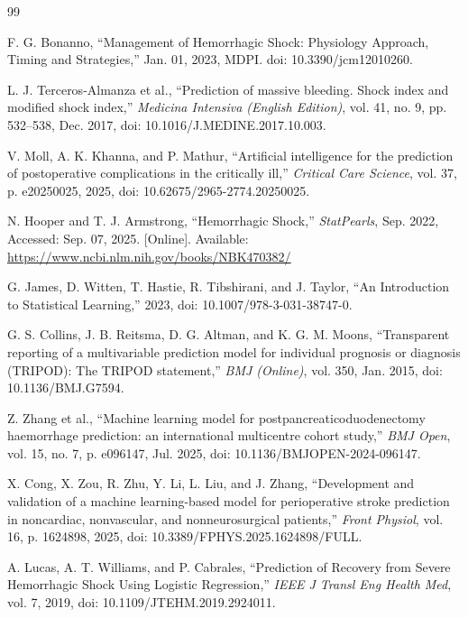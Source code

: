 \documentclass[12pt, letterpaper]{article}
\begin{document}
\begin{thebibliography}{99}

F. G. Bonanno, ``Management of Hemorrhagic Shock: Physiology Approach, Timing and Strategies,'' Jan. 01, 2023, MDPI. doi: 10.3390/jcm12010260.

L. J. Terceros-Almanza et al., ``Prediction of massive bleeding. Shock index and modified shock index,'' \textit{Medicina Intensiva (English Edition)}, vol. 41, no. 9, pp. 532--538, Dec. 2017, doi: 10.1016/J.MEDINE.2017.10.003.

V. Moll, A. K. Khanna, and P. Mathur, ``Artificial intelligence for the prediction of postoperative complications in the critically ill,'' \textit{Critical Care Science}, vol. 37, p. e20250025, 2025, doi: 10.62675/2965-2774.20250025.

N. Hooper and T. J. Armstrong, ``Hemorrhagic Shock,'' \textit{StatPearls}, Sep. 2022, Accessed: Sep. 07, 2025. [Online]. Available: \url{https://www.ncbi.nlm.nih.gov/books/NBK470382/}

G. James, D. Witten, T. Hastie, R. Tibshirani, and J. Taylor, ``An Introduction to Statistical Learning,'' 2023, doi: 10.1007/978-3-031-38747-0.

G. S. Collins, J. B. Reitsma, D. G. Altman, and K. G. M. Moons, ``Transparent reporting of a multivariable prediction model for individual prognosis or diagnosis (TRIPOD): The TRIPOD statement,'' \textit{BMJ (Online)}, vol. 350, Jan. 2015, doi: 10.1136/BMJ.G7594.

Z. Zhang et al., ``Machine learning model for postpancreaticoduodenectomy haemorrhage prediction: an international multicentre cohort study,'' \textit{BMJ Open}, vol. 15, no. 7, p. e096147, Jul. 2025, doi: 10.1136/BMJOPEN-2024-096147.

X. Cong, X. Zou, R. Zhu, Y. Li, L. Liu, and J. Zhang, ``Development and validation of a machine learning-based model for perioperative stroke prediction in noncardiac, nonvascular, and nonneurosurgical patients,'' \textit{Front Physiol}, vol. 16, p. 1624898, 2025, doi: 10.3389/FPHYS.2025.1624898/FULL.

A. Lucas, A. T. Williams, and P. Cabrales, ``Prediction of Recovery from Severe Hemorrhagic Shock Using Logistic Regression,'' \textit{IEEE J Transl Eng Health Med}, vol. 7, 2019, doi: 10.1109/JTEHM.2019.2924011.


\end{thebibliography}
\end{document}
